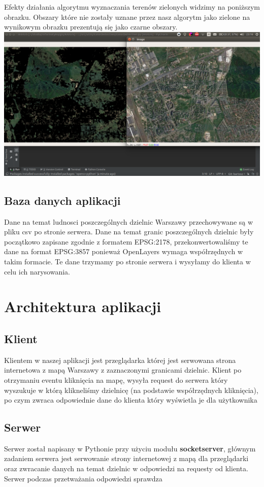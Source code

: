 \documentclass[11pt]{article}
\begin{document}
	Efekty działania algorytmu wyznaczania terenów zielonych widzimy na poniższym obrazku. Obszary które nie zostały uznane przez nasz algorytm jako zielone na wynikowym obrazku prezentują się jako czarne obszary.
	\includegraphics[scale=0.3]{green_areas_algorithm} 

	\subsection{Baza danych aplikacji}
	Dane na temat ludnosci poszczególnych dzielnic Warszawy przechowywane są w pliku csv po stronie serwera. Dane na temat granic poszczególnych dzielnic były początkowo zapisane zgodnie z formatem EPSG:2178, przekonwertowaliśmy te dane na format EPSG:3857 ponieważ OpenLayers wymaga współrzędnych w takim formacie. Te dane trzymamy po stronie serwera i wysyłamy do klienta w celu ich narysowania.

\section{Architektura aplikacji}
	\subsection{Klient}
	Klientem w naszej aplikacji jest przeglądarka której jest serwowana strona internetowa z mapą Warszawy z zaznaczonymi granicami dzielnic. Klient po otrzymaniu eventu kliknięcia na mapę, wysyła request do serwera który wyszukuje w którą klikneliśmy dzielnicę (na podstawie współrzędnych kliknięcia), po czym zwraca odpowiednie dane do klienta który wyświetla je dla użytkownika
	\subsection{Serwer}
	Serwer został napisany w Pythonie przy użyciu modułu \textbf{socketserver}, głównym zadaniem serwera jest serwowanie strony internetowej z mapą dla przeglądarki oraz zwracanie danych na temat dzielnic w odpowiedzi na requesty od klienta. Serwer podczas przetważania odpowiedzi sprawdza 
	
\end{document}
